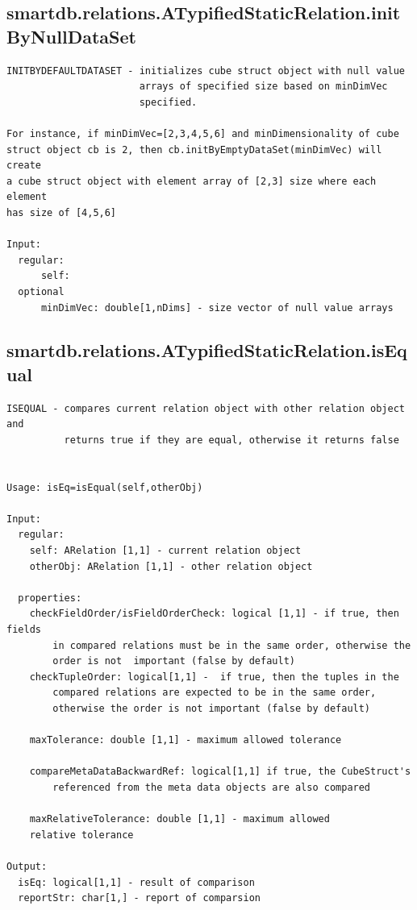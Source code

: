 \documentclass[letterpaper,10pt,english]{sphinxmanual}
\begin{document}
\subsection{smartdb.relations.ATypifiedStaticRelation.initByNullDataSet}
\label{chap_functions:smartdb-relations-atypifiedstaticrelation-initbynulldataset}
\begin{Verbatim}[commandchars=\\\{\}]
INITBYDEFAULTDATASET - initializes cube struct object with null value
                       arrays of specified size based on minDimVec
                       specified.

For instance, if minDimVec=[2,3,4,5,6] and minDimensionality of cube
struct object cb is 2, then cb.initByEmptyDataSet(minDimVec) will create
a cube struct object with element array of [2,3] size where each element
has size of [4,5,6]

Input:
  regular:
      self:
  optional
      minDimVec: double[1,nDims] - size vector of null value arrays
\end{Verbatim}


\subsection{smartdb.relations.ATypifiedStaticRelation.isEqual}
\label{chap_functions:smartdb-relations-atypifiedstaticrelation-isequal}
\begin{Verbatim}[commandchars=\\\{\}]
ISEQUAL - compares current relation object with other relation object and
          returns true if they are equal, otherwise it returns false


Usage: isEq=isEqual(self,otherObj)

Input:
  regular:
    self: ARelation [1,1] - current relation object
    otherObj: ARelation [1,1] - other relation object

  properties:
    checkFieldOrder/isFieldOrderCheck: logical [1,1] - if true, then fields
        in compared relations must be in the same order, otherwise the
        order is not  important (false by default)
    checkTupleOrder: logical[1,1] -  if true, then the tuples in the
        compared relations are expected to be in the same order,
        otherwise the order is not important (false by default)

    maxTolerance: double [1,1] - maximum allowed tolerance

    compareMetaDataBackwardRef: logical[1,1] if true, the CubeStruct's
        referenced from the meta data objects are also compared

    maxRelativeTolerance: double [1,1] - maximum allowed
    relative tolerance

Output:
  isEq: logical[1,1] - result of comparison
  reportStr: char[1,] - report of comparsion
\end{Verbatim}
\end{document}
